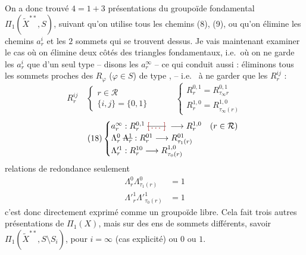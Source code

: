 \documentclass[11pt,a4paper]{article}
\begin{document}
On a donc trouvé $4 = 1 + 3$ présentations du groupoïde fondamental $\Pi_1(\tilde X^{\ast\ast}, S)$, suivant qu'on utilise tous les chemins (8), (9), ou qu'on élimine les chemins $a^i_r$  et les $2$ sommets qui se trouvent dessus. Je vais maintenant examiner le cas où on élimine \struck{\ill{}} deux côtés des triangles fondamentaux, i.e.\ où on ne garde les $a^i_r$ que d'un seul type -- disons les $a^\infty_r$ -- ce qui conduit aussi : éliminons tous les sommets  proches des $R_\varphi$ ($\varphi \in S$) de type \struck{$\infty$ \ill{}},    -- i.e.\  à ne garder que les $R^{ij}_r$   :
\begin{equation*}
  \tag{17} R^{ij}_r \quad
  \begin{cases}
    r \in \mathcal{R} \\
    \{i, j\} = \{0, 1\}
  \end{cases}
  \qquad\quad
  \boxed{
  \begin{cases}
    R^{0,1}_r = R^{0,1}_{\tau_\infty r} \\
    R^{1,0}_r = R^{1,0}_{\tau_\infty(r)}
  \end{cases}}
\end{equation*}
\begin{equation*}
  \tag{18}
  \begin{cases}
    a^\infty_r : R^{0,1}_r \;\text{\struck{\ill{}}}\; \longrightarrow R^{1,0}_r & (r \in \mathcal{R}) \\
    \Lambda^0_r \;\text{\struck{$\Lambda^1_r$}} : R^{01}_r \longrightarrow R^{01}_{\tau_1(r)} \\
    \Lambda'^1_r : R^{10}_r \longrightarrow R^{1,0}_{\tau_0(r)}
  \end{cases}
\end{equation*}
 relations de redondance seulement
\begin{equation*}
  \tag{19}
  \boxed{
  \begin{aligned}
    \Lambda^0_r \Lambda^0_{\tau_1(r)} &= 1 \\
    \Lambda'^1_r \Lambda'^1_{\tau_0(r)} &= 1
  \end{aligned}}
\end{equation*}
c'est donc directement exprimé comme un groupoïde libre. Cela fait trois autres présentations de $\Pi_1(X)$, mais sur des ens de sommets différents, savoir $\Pi_1(\tilde X^{\ast\ast}, S \setminus S_i)$, pour $i = \infty$ (cas explicité) ou $0$ ou $1$.
\end{document}
